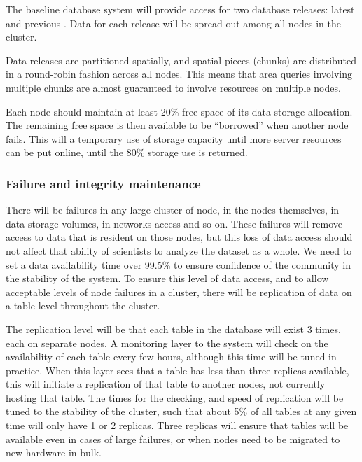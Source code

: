 \documentclass[DM,lsstdraft,toc]{lsstdoc}
\begin{document}
The baseline database system will provide access for two database
releases: latest and previous . Data for each release will be spread out
among all nodes in the cluster.

Data releases are partitioned spatially, and spatial pieces (chunks) are
distributed in a round-robin fashion across all nodes. This means that
area queries involving multiple chunks are almost guaranteed to involve
resources on multiple nodes.

Each node should maintain at least 20\% free space of its data storage
allocation. The remaining free space is then available to be
``borrowed'' when another node fails. This will a temporary use of
storage capacity until more server resources can be put online, until
the 80\% storage use is returned.

\subsubsection{Failure and integrity
maintenance}\label{failure-and-integrity-maintenance}

There will be failures in any large cluster of node, in the nodes
themselves, in data storage volumes, in networks access and so on. These
failures will remove access to data that is resident on those nodes, but
this loss of data access should not affect that ability of scientists to
analyze the dataset as a whole. We need to set a data availability time
over 99.5\% to ensure confidence of the community in the stability of
the system. To ensure this level of data access, and to allow acceptable
levels of node failures in a cluster, there will be replication of data
on a table level throughout the cluster.

The replication level will be that each table in the database will exist
3 times, each on separate nodes. A monitoring layer to the system will
check on the availability of each table every few hours, although this
time will be tuned in practice. When this layer sees that a table has
less than three replicas available, this will initiate a replication of
that table to another nodes, not currently hosting that table. The times
for the checking, and speed of replication will be tuned to the
stability of the cluster, such that about 5\% of all tables at any given
time will only have 1 or 2 replicas. Three replicas will ensure that
tables will be available even in cases of large failures, or when nodes
need to be migrated to new hardware in bulk.
\end{document}
